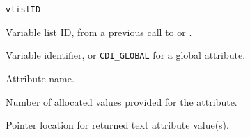 \hspace*{4mm}\begin{minipage}[]{15cm}
\begin{deflist}{\tt vlistID\ }
\item[{\tt vlistID}]
Variable list ID, from a previous call to {} or {}.
\item[{\tt varID}]
Variable identifier, or {\tt CDI\_GLOBAL} for a global attribute.
\item[{\tt name}]
Attribute name.
\item[{\tt mlen}]
Number of allocated values provided for the attribute.
\item[{\tt tp}]
Pointer location for returned text attribute value(s).

\end{deflist}
\end{minipage}
